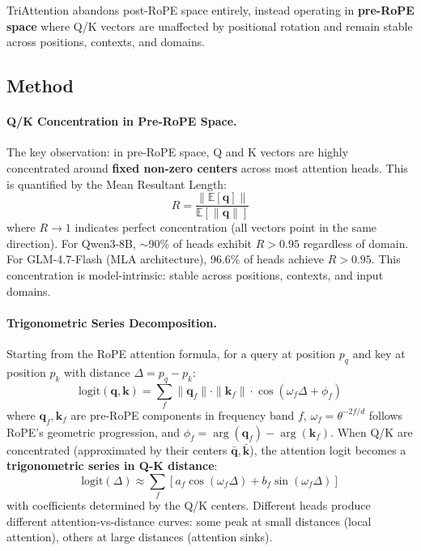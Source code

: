 \documentclass[11pt]{article}
\begin{document}
TriAttention abandons post-RoPE space entirely, instead operating in \textbf{pre-RoPE space} where Q/K vectors are unaffected by positional rotation and remain stable across positions, contexts, and domains.

\subsection{Method}

\paragraph{Q/K Concentration in Pre-RoPE Space.}
The key observation: in pre-RoPE space, Q and K vectors are highly concentrated around \textbf{fixed non-zero centers} across most attention heads. This is quantified by the Mean Resultant Length:
\begin{equation}
    R = \frac{\|\mathbb{E}[\mathbf{q}]\|}{\mathbb{E}[\|\mathbf{q}\|]}
\end{equation}
where $R \to 1$ indicates perfect concentration (all vectors point in the same direction). For Qwen3-8B, $\sim$90\% of heads exhibit $R > 0.95$ regardless of domain. For GLM-4.7-Flash (MLA architecture), 96.6\% of heads achieve $R > 0.95$. This concentration is model-intrinsic: stable across positions, contexts, and input domains.

\paragraph{Trigonometric Series Decomposition.}
Starting from the RoPE attention formula, for a query at position $p_q$ and key at position $p_k$ with distance $\Delta = p_q - p_k$:
\begin{equation}
    \mathrm{logit}(\mathbf{q}, \mathbf{k}) = \sum_f \|\mathbf{q}_f\| \cdot \|\mathbf{k}_f\| \cdot \cos(\omega_f \Delta + \phi_f)
\end{equation}
where $\mathbf{q}_f, \mathbf{k}_f$ are pre-RoPE components in frequency band $f$, $\omega_f = \theta^{-2f/d}$ follows RoPE's geometric progression, and $\phi_f = \arg(\mathbf{q}_f) - \arg(\mathbf{k}_f)$. When Q/K are concentrated (approximated by their centers $\bar{\mathbf{q}}, \bar{\mathbf{k}}$), the attention logit becomes a \textbf{trigonometric series in Q-K distance}:
\begin{equation}
    \mathrm{logit}(\Delta) \approx \sum_f \left[a_f \cos(\omega_f \Delta) + b_f \sin(\omega_f \Delta)\right]
\end{equation}
with coefficients determined by the Q/K centers. Different heads produce different attention-vs-distance curves: some peak at small distances (local attention), others at large distances (attention sinks).
\end{document}
